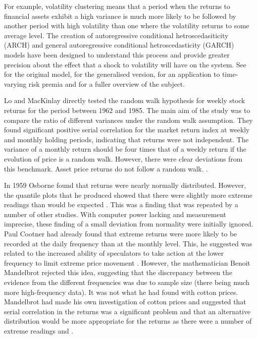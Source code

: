 \documentclass[12pt, a4paper, oneside]{article} %
\begin{document}
For example, volatility clustering means that a period when the returns to financial assets exhibit a high variance is much more likely to be followed by another period with high volatility than one where the volatility returns to some average level.  The creation of autoregressive conditional hetroscedasiticity (ARCH) and general autoregressive  conditional hetroscedasticity (GARCH) models have been designed to understand this process and provide greater precision about the effect that a shock to volatility will have on the system.  See \citep{Engle1982} for the original model, \citep{Bollerslev1986} for the generalised version, \citep{Engle1987} for an application to time-varying risk premia and \citep[pp. 657 - 665]{Hamilton} for a fuller overview of the subject.   

Lo and MacKinlay directly tested the random walk hypothesis for weekly stock returns for the period between 1962 and 1985. The main aim of the study was to compare the ratio of different variances under the random walk assumption.  They found significant positive serial correlation for the market return index at weekly and monthly holding periods, indicating that returns were not independent.  The variance of a monthly return should be four times that of a weekly return if the evolution of price is a random walk.  However, there were clear deviations from this benchmark.    Asset price returns do not follow a random walk. \citep{LoMacKinlay1988}.  

In 1959 Osborne found that returns were nearly normally distributed.  However, the quantile plots that he produced showed that there were slightly more extreme readings than would be expected \citep{Osborne1959}.  This was a finding that was repeated by a number of other studies.  With computer power lacking and measurement imprecise, these finding of a small deviation from normality were initially ignored.  Paul Cootner had already found that extreme returns were more likely to be recorded at the daily frequency than at the monthly level.  This, he suggested was related to the increased ability of speculators to take action at the lower frequency to limit extreme price movement \citep{Cootner1962}. However, the mathematician Benoit Mandelbrot rejected this idea, suggesting that the discrepancy between the evidence from the different frequencies was due to sample size (there being much more high-frequency data).  It was not what he had found with cotton prices.  Mandelbrot had made his own investigation of cotton prices and suggested that serial correlation in the returns was a significant problem and that an alternative distribution would be more appropriate for the returns as there were a number of extreme readings \citep{Mandelbrot1963} and \citep{Mandelbrot1971}.  
\end{document}
